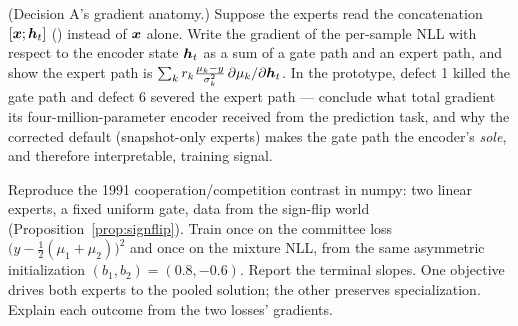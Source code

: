 \begin{exercise}\label{ex:5-decisionA}
(Decision A's gradient anatomy.) Suppose the experts read the
concatenation $[\bm{x}; \bm{h}_t]$ ()
instead of $\bm{x}$ alone. Write the gradient of the per-sample NLL with
respect to the encoder state $\bm{h}_t$ as a sum of a gate path and an
expert path, and show the expert path is
$\sum_k r_k \frac{\mu_k - y}{\sigma_k^2}\,
\partial \mu_k / \partial \bm{h}_t$. In the prototype, defect 1 killed the
gate path and defect 6 severed the expert path --- conclude what total
gradient its four-million-parameter encoder received from the prediction
task, and why the corrected default (snapshot-only experts) makes the
gate path the encoder's \emph{sole}, and therefore interpretable,
training signal.
\end{exercise}

\begin{exercise}\label{ex:5-jjnh}
Reproduce the 1991 cooperation/competition contrast in numpy: two linear
experts, a fixed uniform gate, data from the sign-flip world
(Proposition~\ref{prop:signflip}). Train once on the committee loss
$\bigl(y - \tfrac12(\mu_1 + \mu_2)\bigr)^2$ and once on the mixture NLL,
from the same asymmetric initialization $(b_1, b_2) = (0.8, -0.6)$.
Report the terminal slopes. One objective drives both experts to the
pooled solution; the other preserves specialization. Explain each
outcome from the two losses' gradients.
\end{exercise}
